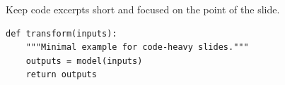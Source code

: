 \begin{frame}

  \vspace{14mm}
  {\small Keep code excerpts short and focused on the point of the slide.}\par
  \vspace{1mm}

\begin{lstlisting}[style=pythoncode]
def transform(inputs):
    """Minimal example for code-heavy slides."""
    outputs = model(inputs)
    return outputs
\end{lstlisting}

  \slideheaderfooter
\end{frame}
